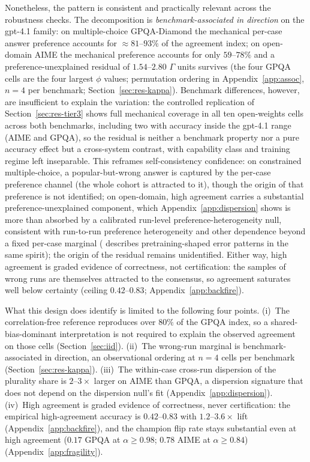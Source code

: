 \documentclass[a4paper,fleqn]{cas-sc}
\newcommand{\agreementIndex}{\Gamma}
\begin{document}
Nonetheless, the pattern is consistent and practically relevant across the robustness checks. The decomposition is
\emph{benchmark-associated in direction} on the gpt-4.1 family: on multiple-choice GPQA-Diamond the
mechanical per-case answer preference accounts for $\approx81$--$93\%$
of the agreement index; on open-domain AIME the mechanical preference
accounts for
only $59$--$78\%$ and a preference-unexplained residual of $1.54$--$2.80$ $\agreementIndex$
units survives (the four GPQA cells are the four largest $\phi$ values;
permutation ordering in Appendix~\ref{app:assoc}, $n=4$ per benchmark;
Section~\ref{sec:res-kappa}).
Benchmark differences, however, are insufficient to explain the
variation: the controlled replication of Section~\ref{sec:res-tier3}
shows full mechanical coverage in all ten open-weights cells
across both benchmarks, including two with accuracy inside the gpt-4.1 range
(AIME and GPQA),
so the residual is neither a benchmark property nor a pure accuracy
effect but a cross-system contrast, with capability class and training
regime left inseparable.
This reframes self-consistency confidence: on
constrained multiple-choice, a popular-but-wrong answer is captured by
the per-case preference channel (the whole cohort is attracted to it),
though the origin of that preference is not identified; on open-domain,
high agreement
carries a substantial preference-unexplained component, which
Appendix~\ref{app:dispersion} shows is more than absorbed by a calibrated run-level
preference-heterogeneity null, consistent with run-to-run preference
heterogeneity and other dependence beyond a fixed per-case marginal
(\cite{mccoy2024} describes pretraining-shaped error patterns in the
same spirit); the origin of the residual remains unidentified. Either
way,
high agreement is graded evidence of correctness, not certification: the
samples of wrong runs are themselves attracted to the consensus, so
agreement saturates well below certainty (ceiling $0.42$--$0.83$;
Appendix~\ref{app:backfire}).

What this design does identify is limited to the following four points. (i)~The correlation-free reference reproduces over $80\%$ of the GPQA
index, so a shared-bias-dominant interpretation is not required to
explain the observed agreement on those cells
(Section~\ref{sec:iid}).
(ii)~The wrong-run marginal is benchmark-associated in direction, an
observational ordering at $n=4$ cells per benchmark
(Section~\ref{sec:res-kappa}). (iii)~The within-case cross-run
dispersion of the plurality share is $2$--$3\times$ larger on AIME than
GPQA, a dispersion signature that does not depend on the dispersion
null's fit (Appendix~\ref{app:dispersion}). (iv)~High agreement is
graded evidence of correctness, never certification: the empirical
high-agreement accuracy is $0.42$--$0.83$ with $1.2$--$3.6\times$ lift
(Appendix~\ref{app:backfire}), and the champion flip rate
stays substantial even at high agreement ($0.17$ GPQA at $\alpha\ge0.98$;
$0.78$ AIME at $\alpha\ge0.84$)
(Appendix~\ref{app:fragility}).
\end{document}

